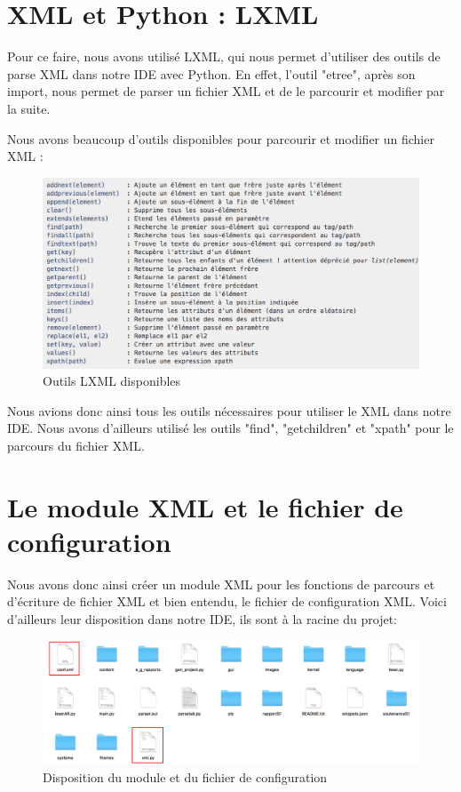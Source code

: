 \documentclass[a4paper,12pt]{article}
\begin{document}
\section{XML et Python : LXML}

Pour ce faire, nous avons utilisé LXML, qui nous permet d'utiliser des outils de parse XML dans notre IDE avec Python. En effet, l'outil "etree", après son import, nous permet de parser un fichier XML et de le parcourir et modifier par la suite.
		
Nous avons beaucoup d'outils disponibles pour parcourir et modifier un fichier XML : 

\begin{figure}[h!]
			\begin{center}
				\includegraphics[scale=0.6]{images/lxml.png}
				\caption{Outils LXML disponibles}
			\end{center}
		\end{figure}

Nous avions donc ainsi tous les outils nécessaires pour utiliser le XML dans notre IDE. Nous avons d'ailleurs utilisé les outils "find", "getchildren" et "xpath" pour le parcours du fichier XML.

\section{Le module XML et le fichier de configuration}

Nous avons donc ainsi créer un module XML pour les fonctions de parcours et d'écriture de fichier XML et bien entendu, le fichier de configuration XML. Voici d'ailleurs leur disposition dans notre IDE, ils sont à la racine du projet:

\newpage

\begin{figure}[h!]
			\begin{center}
				\includegraphics[scale=0.23]{images/dossier.png}
				\caption{Disposition du module et du fichier de configuration}
			\end{center}
		\end{figure}
		
\end{document}
